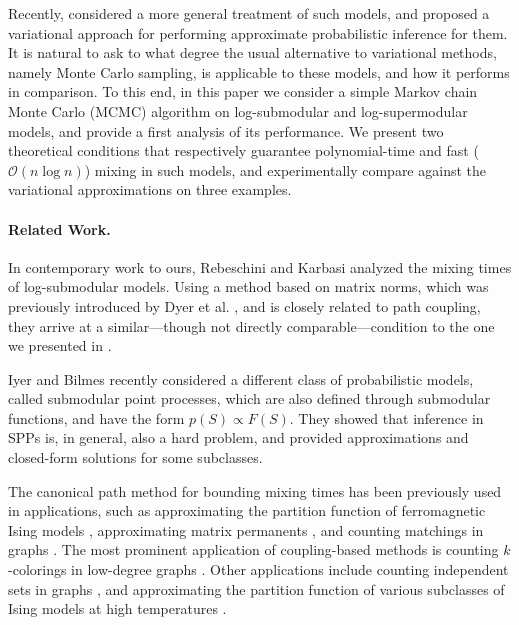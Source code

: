 Recently, \citet{djolonga14} considered a more general treatment of such models, and proposed a variational approach for performing approximate probabilistic inference for them.
It is natural to ask to what degree the usual alternative to variational methods, namely Monte Carlo sampling, is applicable to these models, and how it performs in comparison.
To this end, in this paper we consider a simple Markov chain Monte Carlo (MCMC) algorithm on log-submodular and log-supermodular models, and provide a first analysis of its performance.
We present two theoretical conditions that respectively guarantee polynomial-time and fast ($\mathcal{O}(n \log n)$) mixing in such models, and experimentally compare against the variational approximations on three examples.

\paragraph{Related Work.}
In contemporary work to ours, Rebeschini and Karbasi \cite{rebeschini15} analyzed the mixing times of log-submodular models.
Using a method based on matrix norms, which was previously introduced by Dyer et al. \cite{dyer09}, and is closely related to path coupling, they arrive at a similar---though not directly comparable---condition to the one we presented in .

Iyer and Bilmes \cite{iyer15} recently considered a different class of probabilistic models, called submodular point processes, which are also defined through submodular functions, and have the form $p(S) \propto F(S)$.
They showed that inference in SPPs is, in general, also a hard problem, and provided approximations and closed-form solutions for some subclasses.

The canonical path method for bounding mixing times has been previously used in applications, such as approximating the partition function of ferromagnetic Ising models \cite{jerrum93}, approximating matrix permanents \cite{jerrum89,jerrum04perm}, and counting matchings in graphs \cite{jerrum03}.
The most prominent application of coupling-based methods is counting $k$-colorings in low-degree graphs \cite{jerrum95,bubley98,jerrum03}.
Other applications include counting independent sets in graphs \cite{dyer00}, and approximating the partition function of various subclasses of Ising models at high temperatures \cite{levin08}.

